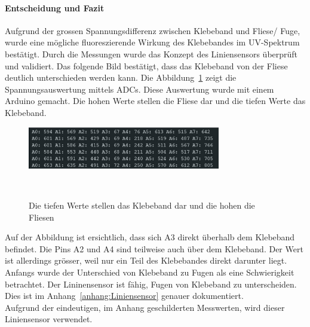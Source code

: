 \documentclass[main.tex]{subfiles} %
\begin{document}
\paragraph{Entscheidung und Fazit}
Aufgrund der grossen Spannungsdifferenz zwischen Klebeband und Fliese/ Fuge, wurde eine mögliche
fluoreszierende Wirkung des Klebebandes im UV-Spektrum bestätigt. Durch die Messungen wurde das 
Konzept des Liniensensors überprüft und validiert. Das folgende Bild bestätigt, dass das Klebeband
von der Fliese deutlich unterschieden werden kann. Die Abbildung~\ref{fig:Auswertung_Strecke_Beispiel} zeigt
die Spannungsauswertung mittels ADCs. Diese Auswertung wurde mit einem Arduino gemacht. Die hohen 
Werte stellen die Fliese dar und die tiefen Werte das Klebeband.

\begin{figure}[H]
    \centering
    \includegraphics[width=0.75\textwidth]{fig_Strecke_Tracken/Auswertung_Strecke.pdf}
    \caption{Die tiefen Werte stellen das Klebeband dar und die hohen die Fliesen}~\label{fig:Auswertung_Strecke_Beispiel}
\end{figure}

Auf der Abbildung ist ersichtlich, dass sich A3 direkt überhalb dem Klebeband befindet. Die Pins A2 und A4 sind 
teilweise auch über dem Klebeband. Der Wert ist allerdings grösser, weil nur ein Teil des Klebebandes direkt darunter
liegt.\\
Anfangs wurde der Unterschied von Klebeband zu Fugen als eine Schwierigkeit betrachtet. Der Lininensensor ist fähig, 
Fugen von Klebeband zu unterscheiden. Dies ist im Anhang~\ref{anhang:Liniensensor} genauer dokumentiert.\\
Aufgrund der eindeutigen, im Anhang geschilderten  Messwerten, wird dieser Liniensensor verwendet.
\end{document}
